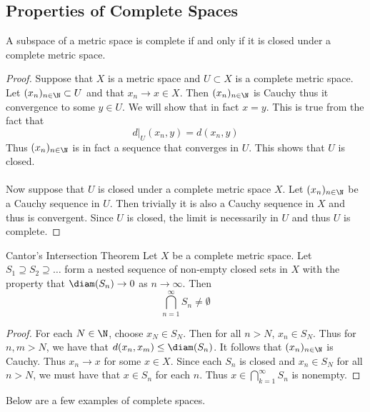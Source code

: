 \subsection{Properties of Complete Spaces}
\begin{prp}{}{} A subspace of a metric space is complete if and only if it is closed under a complete metric space. \tcbline
\begin{proof}
Suppose that $X$ is a metric space and $U\subset X$ is a complete metric space. Let $(x_n)_{n\in\N}\subset U$ and that $x_n\to x\in X$. Then $(x_n)_{n\in\N}$ is Cauchy thus it convergence to some $y\in U$. We will show that in fact $x=y$. This is true from the fact that $$d|_U(x_n,y)=d(x_n,y)$$ Thus $(x_n)_{n\in\N}$ is in fact a sequence that converges in $U$. This shows that $U$ is closed. \\~\\
Now suppose that $U$ is closed under a complete metric space $X$. Let $(x_n)_{n\in\N}$ be a Cauchy sequence in $U$. Then trivially it is also a Cauchy sequence in $X$ and thus is convergent. Since $U$ is closed, the limit is necessarily in $U$ and thus $U$ is complete. 
\end{proof}
\end{prp}

\begin{thm}{Cantor's Intersection Theorem}{} Let $X$ be a complete metric space. Let $S_1\supseteq S_2\supseteq\dots$ form a nested sequence of non-empty closed sets in $X$ with the property that $\diam(S_n)\to 0$ as $n\to\infty$. Then $$\bigcap_{n=1}^\infty S_n\neq\emptyset$$ \tcbline
\begin{proof}
For each $N\in\N$, choose $x_N\in S_N$. Then for all $n>N$, $x_n\in S_N$. Thus for $n,m>N$, we have that $d(x_n,x_m)\leq\diam(S_n)$. It follows that $(x_n)_{n\in\N}$ is Cauchy. Thus $x_n\to x$ for some $x\in X$. Since each $S_n$ is closed and $x_n\in S_N$ for all $n>N$, we must have that $x\in S_n$ for each $n$. Thus $x\in\bigcap_{k=1}^\infty S_n$ is nonempty. 
\end{proof}
\end{thm}

Below are a few examples of complete spaces. 


